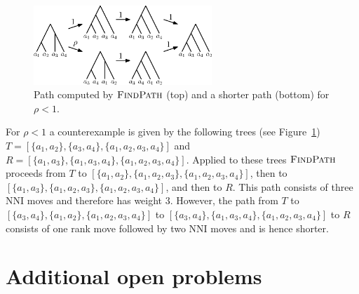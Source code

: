 \documentclass[11pt]{amsart}
\newcommand{\findpath}{\textsc{FindPath}}
\newcommand{\nni}{\mathrm{NNI}}
\begin{document}
\begin{figure}[ht]
\centering
\includegraphics[width=0.6\textwidth]{fp_rho_less_1_counterexample}
\caption{Path computed by $\findpath$ (top) and a shorter path (bottom) for $\rho < 1$.}
\label{fig:fp_rho_less_1_counterexample}
\end{figure}

For $\rho < 1$ a counterexample is given by the following trees (see Figure~\ref{fig:fp_rho_less_1_counterexample})\\
$T = [\{a_1,a_2\},\{a_3,a_4\},\{a_1,a_2,a_3,a_4\}]$ and\\
$R = [\{a_1,a_3\},\{a_1,a_3,a_4\},\{a_1,a_2,a_3,a_4\}]$.
Applied to these trees $\findpath$ proceeds from $T$ to $[\{a_1,a_2\},\{a_1,a_2,a_3\},\{a_1,a_2,a_3,a_4\}]$, then to $[\{a_1,a_3\},\{a_1,a_2,a_3\},\{a_1,a_2,a_3,a_4\}]$, and then to $R$.
This path consists of three $\nni$ moves and therefore has weight $3$.
However, the path from $T$ to $[\{a_3, a_4\},\{a_1, a_2\},\{a_1, a_2, a_3, a_4\}]$ to $[\{a_3,a_4\},\{a_1, a_3, a_4\},\{a_1, a_2, a_3, a_4\}]$ to $R$ consists of one rank move followed by two $\nni$ moves and is hence shorter.
\endproof


\section{Additional open problems}
\end{document}
